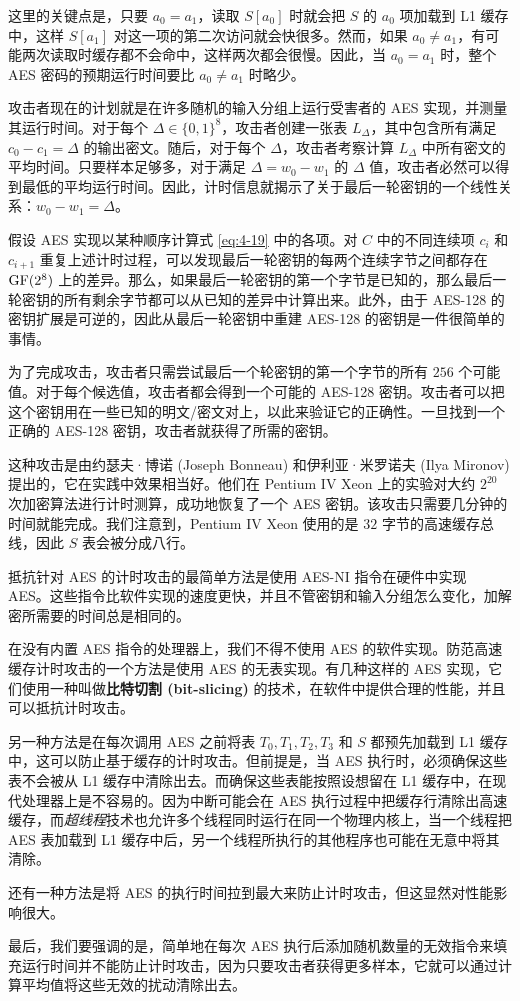这里的关键点是，只要 $a_0=a_1$，读取 $S[a_0]$ 时就会把 $S$ 的 $a_0$ 项加载到 L1 缓存中，这样 $S[a_1]$ 对这一项的第二次访问就会快很多。然而，如果 $a_0\neq a_1$，有可能两次读取时缓存都不会命中，这样两次都会很慢。因此，当 $a_0=a_1$ 时，整个 AES 密码的预期运行时间要比 $a_0\neq a_1$ 时略少。

攻击者现在的计划就是在许多随机的输入分组上运行受害者的 AES 实现，并测量其运行时间。对于每个 $\Delta\in\{0,1\}^8$，攻击者创建一张表 $L_\Delta$，其中包含所有满足 $c_0-c_1=\Delta$ 的输出密文。随后，对于每个 $\Delta$，攻击者考察计算 $L_\Delta$ 中所有密文的平均时间。只要样本足够多，对于满足 $\Delta=w_0-w_1$ 的 $\Delta$ 值，攻击者必然可以得到最低的平均运行时间。因此，计时信息就揭示了关于最后一轮密钥的一个线性关系：$w_0-w_1=\Delta$。

假设 AES 实现以某种顺序计算式 \ref{eq:4-19} 中的各项。对 $C$ 中的不同连续项 $c_i$ 和 $c_{i+1}$ 重复上述计时过程，可以发现最后一轮密钥的每两个连续字节之间都存在 ${\rm GF}(2^8)$ 上的差异。那么，如果最后一轮密钥的第一个字节是已知的，那么最后一轮密钥的所有剩余字节都可以从已知的差异中计算出来。此外，由于 AES-128 的密钥扩展是可逆的，因此从最后一轮密钥中重建 AES-128 的密钥是一件很简单的事情。

为了完成攻击，攻击者只需尝试最后一个轮密钥的第一个字节的所有 $256$ 个可能值。对于每个候选值，攻击者都会得到一个可能的 AES-128 密钥。攻击者可以把这个密钥用在一些已知的明文/密文对上，以此来验证它的正确性。一旦找到一个正确的 AES-128 密钥，攻击者就获得了所需的密钥。

这种攻击是由约瑟夫·博诺 (Joseph Bonneau) 和伊利亚·米罗诺夫 (Ilya Mironov) 提出的，它在实践中效果相当好。他们在 Pentium IV Xeon 上的实验对大约 $2^{20}$ 次加密算法进行计时测算，成功地恢复了一个 AES 密钥。该攻击只需要几分钟的时间就能完成。我们注意到，Pentium IV Xeon 使用的是 $32$ 字节的高速缓存总线，因此 $S$ 表会被分成八行。

\begin{snote}[缓和措施。]
抵抗针对 AES 的计时攻击的最简单方法是使用 AES-NI 指令在硬件中实现 AES。这些指令比软件实现的速度更快，并且不管密钥和输入分组怎么变化，加解密所需要的时间总是相同的。

在没有内置 AES 指令的处理器上，我们不得不使用 AES 的软件实现。防范高速缓存计时攻击的一个方法是使用 AES 的无表实现。有几种这样的 AES 实现，它们使用一种叫做\textbf{比特切割 (bit-slicing)} 的技术，在软件中提供合理的性能，并且可以抵抗计时攻击。

另一种方法是在每次调用 AES 之前将表 $T_0,T_1,T_2,T_3$ 和 $S$ 都预先加载到 L1 缓存中，这可以防止基于缓存的计时攻击。但前提是，当 AES 执行时，必须确保这些表不会被从 L1 缓存中清除出去。而确保这些表能按照设想留在 L1 缓存中，在现代处理器上是不容易的。因为中断可能会在 AES 执行过程中把缓存行清除出高速缓存，而\emph{超线程}技术也允许多个线程同时运行在同一个物理内核上，当一个线程把 AES 表加载到 L1 缓存中后，另一个线程所执行的其他程序也可能在无意中将其清除。

还有一种方法是将 AES 的执行时间拉到最大来防止计时攻击，但这显然对性能影响很大。

最后，我们要强调的是，简单地在每次 AES 执行后添加随机数量的无效指令来填充运行时间并不能防止计时攻击，因为只要攻击者获得更多样本，它就可以通过计算平均值将这些无效的扰动清除出去。
\end{snote}

